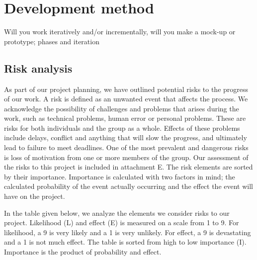 \section{Development method}
Will you work iteratively and/or incrementally, will you make a 
mock-up or prototype; phases and iteration



\subsection{Risk analysis}
As part of our project planning, we have outlined potential risks to the progress of our work. A risk is defined as an unwanted event that affects the process. We acknowledge the possibility of challenges and problems that arises during the work, such as technical problems, human error or personal problems. These are risks for both individuals and the group as a whole. Effects of these problems include delays, conflict and anything that will slow the progress, and ultimately lead to failure to  meet deadlines. One of the most prevalent and dangerous risks is loss of motivation from one or more members of the group. Our assessment of the risks to this project is included in attachment E. The risk elements are sorted by their importance. Importance is calculated with two factors in mind; the calculated probability of the event actually occurring and the effect the event will have on the project. 

In the table given below, we analyze the elements we consider risks to our project. Likelihood (L) and effect (E) is measured on a scale from 1 to 9. For likelihood, a 9 is very likely and a 1 is very unlikely. For effect, a 9 is devastating and a 1 is not much effect. The table is sorted from high to low importance (I). Importance is the product of probability and effect. 


